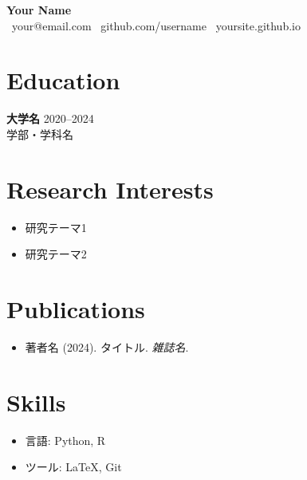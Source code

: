 \documentclass[11pt, a4paper]{article}
\begin{document}
\begin{center}
  {\LARGE \textbf{Your Name}} \\[0.5em]
  \faEnvelope\ your@email.com \quad
  \faGithub\ github.com/username \quad
  \faGlobe\ yoursite.github.io
\end{center}

\section{Education}
\textbf{大学名} \hfill 2020--2024 \\
学部・学科名 \\

\section{Research Interests}
\begin{itemize}[noitemsep]
  \item 研究テーマ1
  \item 研究テーマ2
\end{itemize}

\section{Publications}
\begin{itemize}[noitemsep]
  \item 著者名 (2024). タイトル. \textit{雑誌名}.
\end{itemize}

\section{Skills}
\begin{itemize}[noitemsep]
  \item 言語: Python, R
  \item ツール: LaTeX, Git
\end{itemize}
\end{document}

